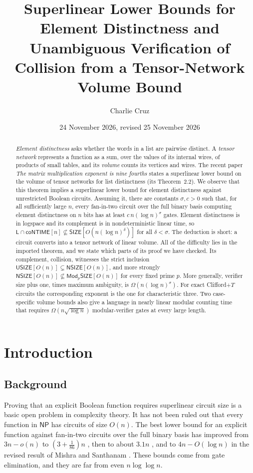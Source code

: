 \documentclass[11pt]{article}
\title{Superlinear Lower Bounds for Element Distinctness and\\Unambiguous Verification of Collision from a Tensor-Network Volume Bound}
\author{Charlie Cruz}
\date{24 November 2026, revised 25 November 2026}
\theoremstyle{definition}
\theoremstyle{remark}
\newcommand{\SIZE}{\mathsf{SIZE}}
\newcommand{\USIZE}{\mathsf{USIZE}}
\newcommand{\NSIZE}{\mathsf{NSIZE}}
\newcommand{\ModSIZE}[1]{\mathsf{Mod}_{#1}\mathsf{SIZE}}
\newcommand{\coNTIME}{\mathsf{coNTIME}}
\newcommand{\Lclass}{\mathsf{L}}
\begin{document}
\maketitle
\begin{abstract}
\emph{Element distinctness} asks whether the words in a list are pairwise
distinct. A \emph{tensor network} represents a function as a sum,
over the values of its internal wires, of products of small tables, and
its \emph{volume} counts its vertices and wires. The recent paper
\emph{The matrix multiplication exponent is nine fourths} \cite{OAI}
states a superlinear lower bound on the volume of tensor networks for
list distinctness (its Theorem~2.2). We observe that this theorem implies
a superlinear lower bound for element distinctness against unrestricted
Boolean circuits. Assuming it, there are constants $\sigma,c>0$ such
that, for all sufficiently large $n$, every fan-in-two circuit over the
full binary basis computing element distinctness on $n$ bits has at
least $c\,n(\log n)^{\sigma}$ gates. Element distinctness is in logspace
and its complement is in nondeterministic linear time, so
$\Lclass\cap\coNTIME[n]\not\subseteq\SIZE[O(n(\log n)^{\delta})]$ for all
$\delta<\sigma$. The deduction is short: a circuit converts into a tensor
network of linear volume. All of the difficulty lies in the imported
theorem, and we state which parts of its proof we have checked.
Its complement, collision, witnesses the strict inclusion
$\USIZE[O(n)]\subsetneq\NSIZE[O(n)]$, and more strongly
$\NSIZE[O(n)]\not\subseteq\ModSIZE{p}[O(n)]$ for every fixed prime $p$.
More generally, verifier size plus one, times maximum ambiguity, is
$\Omega(n(\log n)^\sigma)$.
For exact Clifford+$T$ circuits the corresponding exponent is the one
for characteristic three. Two case-specific volume bounds also give a
language in nearly linear modular counting time that requires
$\Omega(n\sqrt{\log n})$ modular-verifier gates at every large length.
\end{abstract}

\section{Introduction}

\subsection{Background}
Proving that an explicit Boolean function requires superlinear circuit
size is a basic open problem in complexity theory. It has not been ruled
out that every function in $\mathsf{NP}$ has circuits of size $O(n)$. The
best lower bound for an explicit function against fan-in-two circuits
over the full binary basis has improved from $3n-o(n)$ \cite{Blum} to
$(3+\tfrac{1}{86})n$ \cite{FGHK}, then to about $3.1n$ \cite{LY},
and to $4n-O(\log n)$ in the revised result of Mishra and Santhanam
\cite{MS}.
These bounds come from gate elimination, and they are far from even
$n\log\log n$.
\end{document}
